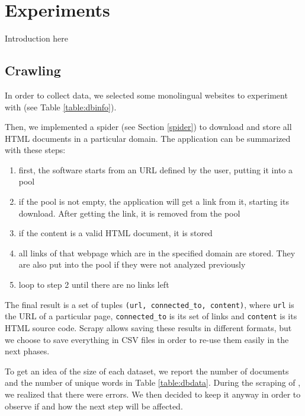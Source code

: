 \chapter{Experiments}
Introduction here

\section{Crawling}
In order to collect data, we selected some monolingual websites to experiment with (see Table \ref{table:dbinfo}).

Then, we implemented a spider (see Section \ref{spider}) to download and store all HTML documents in a particular domain.
The application can be summarized with these steps:
\begin{enumerate}
    \item first, the software starts from an URL defined by the user, putting it into a pool
    \item if the pool is not empty, the application will get a link from it, starting its download. After getting the link, it is removed from the pool
    \item if the content is a valid HTML document, it is stored
    \item all links of that webpage which are in the specified domain are stored. They are also put into the pool if they were not analyzed previously
    \item loop to step 2 until there are no links left
\end{enumerate}
The final result is a set of tuples \texttt{(url, connected\_to, content)}, where \texttt{url} is the URL of a particular page, \texttt{connected\_to} is its set of links and \texttt{content} is its HTML source code.
Scrapy allows saving these results in different formats, but we choose to save everything in CSV files in order to re-use them easily in the next phases.

To get an idea of the size of each dataset, we report the number of documents and the number of unique words in Table \ref{table:dbdata}.
During the scraping of , we realized that there were errors. We then decided to keep it anyway in order to observe if and how the next step will be affected.

